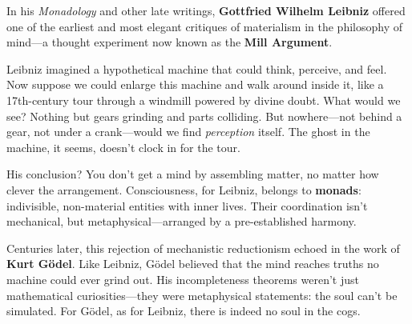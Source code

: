 \begin{tcolorbox}[title={\textbf{Historical Sidebar: No Soul in the Cogs — Leibniz’s Mill Argument}}, colback=gray!5, colframe=black, fonttitle=\bfseries]

  In his \textit{Monadology} and other late writings, \textbf{Gottfried Wilhelm Leibniz} offered one of the earliest and most elegant critiques of materialism in the philosophy of mind—a thought experiment now known as the \textbf{Mill Argument}.
  
  Leibniz imagined a hypothetical machine that could think, perceive, and feel. Now suppose we could enlarge this machine and walk around inside it, like a 17th-century tour through a windmill powered by divine doubt. What would we see? Nothing but gears grinding and parts colliding. But nowhere—not behind a gear, not under a crank—would we find \textit{perception} itself. The ghost in the machine, it seems, doesn’t clock in for the tour.
  
  His conclusion? You don’t get a mind by assembling matter, no matter how clever the arrangement. Consciousness, for Leibniz, belongs to \textbf{monads}: indivisible, non-material entities with inner lives. Their coordination isn’t mechanical, but metaphysical—arranged by a pre-established harmony.
  
  Centuries later, this rejection of mechanistic reductionism echoed in the work of \textbf{Kurt Gödel}. Like Leibniz, Gödel believed that the mind reaches truths no machine could ever grind out. His incompleteness theorems weren’t just mathematical curiosities—they were metaphysical statements: the soul can’t be simulated. For Gödel, as for Leibniz, there is indeed no soul in the cogs.
\end{tcolorbox}











